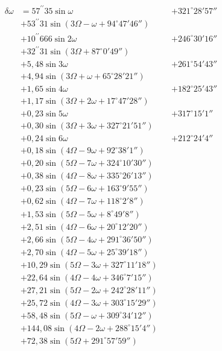 \documentclass[10pt,a4paper]{article}
\begin{document}
\begin{align*}
\delta\omega &= 57^{\prime\prime}35 \sin \omega &&+ 321^{\circ}28'57'' \\
&+ 53^{\prime\prime}31 \sin(3\Omega - \omega + 94^{\circ}47'46'') \\
&+ 10^{\prime\prime}666 \sin 2\omega &&+ 246^{\circ}30'16'' \\
&+ 32^{\prime\prime}31 \sin(3\Omega + 87^{\circ}0'49'') \\
&+ 5,48 \sin 3\omega &&+ 261^{\circ}54'43'' \\
&+ 4,94 \sin(3\Omega + \omega + 65^{\circ}28'21'') \\
&+ 1,65 \sin 4\omega &&+ 182^{\circ}25'43'' \\
&+ 1,17 \sin(3\Omega + 2\omega + 17^{\circ}47'28'') \\
&+ 0,23 \sin 5\omega &&+ 317^{\circ}15'1'' \\
&+ 0,30 \sin(3\Omega + 3\omega + 327^{\circ}21'51'') \\
&+ 0,24 \sin 6\omega &&+ 212^{\circ}24'4'' \\
&+ 0,18 \sin(4\Omega - 9\omega + 92^{\circ}38'1'') \\
&+ 0,20 \sin(5\Omega - 7\omega + 324^{\circ}10'30'') \\
&+ 0,38 \sin(4\Omega - 8\omega + 335^{\circ}26'13'') \\
&+ 0,23 \sin(5\Omega - 6\omega + 163^{\circ}9'55'') \\
&+ 0,62 \sin(4\Omega - 7\omega + 118^{\circ}2'8'') \\
&+ 1,53 \sin(5\Omega - 5\omega + 8^{\circ}49'8'') \\
&+ 2,51 \sin(4\Omega - 6\omega + 20^{\circ}12'20'') \\
&+ 2,66 \sin(5\Omega - 4\omega + 291^{\circ}36'50'') \\
&+ 2,70 \sin(4\Omega - 5\omega + 25^{\circ}39'18'') \\
&+ 10,29 \sin(5\Omega - 3\omega + 327^{\circ}11'18'') \\
&+ 22,64 \sin(4\Omega - 4\omega + 346^{\circ}7'15'') \\
&+ 27,21 \sin(5\Omega - 2\omega + 242^{\circ}28'11'') \\
&+ 25,72 \sin(4\Omega - 3\omega + 303^{\circ}15'29'') \\
&+ 58,48 \sin(5\Omega - \omega + 309^{\circ}34'12'') \\
&+ 144,08 \sin(4\Omega - 2\omega + 288^{\circ}15'4'') \\
&+ 72,38 \sin(5\Omega + 291^{\circ}57'59'') \\

\end{align*}
\end{document}
